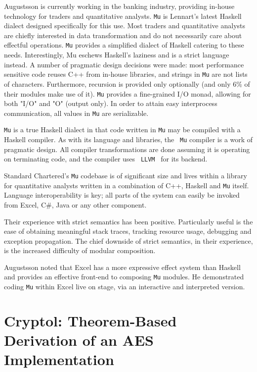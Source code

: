 \documentclass{jfp1}
\begin{document}
Augustsson is currently working in the banking industry, providing in-house
technology for traders and quantitative analysts.  {\tt Mu} is Lennart's latest Haskell
dialect designed specifically for this use.  Most traders and quantitative
analysts are chiefly interested in data transformation and do not
necessarily care about effectful operations.  {\tt Mu} provides a simplified
dialect of Haskell catering to these needs.  Interestingly, Mu eschews
Haskell's laziness and is a strict language instead.  A number of pragmatic design
decisions were made: most performance sensitive code reuses C++ from in-house
libraries, and strings in {\tt Mu} are not lists of characters.  Furthermore,
recursion is provided only optionally (and only 6\% of their modules make use
of it).
{\tt Mu} provides a fine-grained I/O monad, allowing for both "I/O" and "O"
(output only).  In order to attain easy interprocess communication, all values
in {\tt Mu} are serializable.

{\tt Mu} is a true Haskell dialect in that code written in {\tt Mu} may be
compiled with a Haskell compiler.  As with its language and libraries, the {\tt
Mu} compiler is a work of pragmatic design.  All compiler transformations are
done assuming it is operating on terminating code, and the compiler uses {\tt
LLVM}~\cite{Lattner:2004:LCF:977395.977673} for its backend.

Standard Chartered's {\tt Mu} codebase is of significant size and lives within
a library for quantitative analysts written in a combination of C++, Haskell and {\tt Mu}
itself.  Language interoperability is key; all parts of the system can easily
be invoked from Excel, C\#, Java or any other component.

Their experience with strict semantics has been positive.  Particularly useful
is the ease of obtaining meaningful stack traces, tracking resource usage,
debugging and exception propagation.  The chief downside of strict semantics,
in their experience, is the increased difficulty of modular composition.

Augustsson noted that Excel has a more expressive effect system than Haskell and
provides an effective front-end to composing {\tt Mu} modules.  He demonstrated
coding {\tt Mu} within Excel live on stage, via an interactive and interpreted
version.

\section{Cryptol: Theorem-Based Derivation of an AES Implementation}
\end{document}
